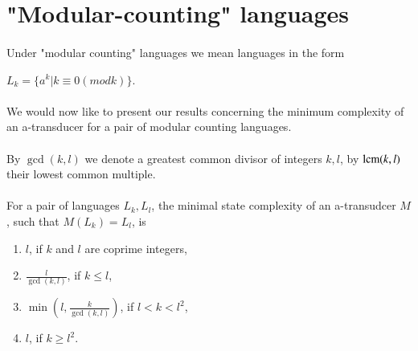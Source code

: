 \section{"Modular-counting" languages}

\paragraph{}
Under "modular counting" languages we mean languages in the form \\
\centerline{$L_k = \{ a^k | k \equiv 0 (mod k) \} $.}

\paragraph{}
We would now like to present our results concerning the minimum complexity of an a-transducer for a pair of modular counting languages.

\paragraph{}
\oznacenie By $\gcd(k,l)$ we denote a greatest common divisor of integers $k,l$, by $\operatorname{lcm}(k,l)$ their lowest common multiple.

\paragraph{}
\clema For a pair of languages $L_k, L_l$, the minimal state complexity of an a-transudcer $M$, such that $M(L_k) = L_l$, is 
\begin{enumerate}
\item $l$, if $k$ and $l$ are coprime integers,
\item $\frac{l}{\gcd(k,l)}$, if $k \leq l$,
\item $\min(l,\frac{k}{\gcd(k,l)})$, if $l < k < l^2$,
\item $l$, if $k \geq l^2$.
\end{enumerate}

